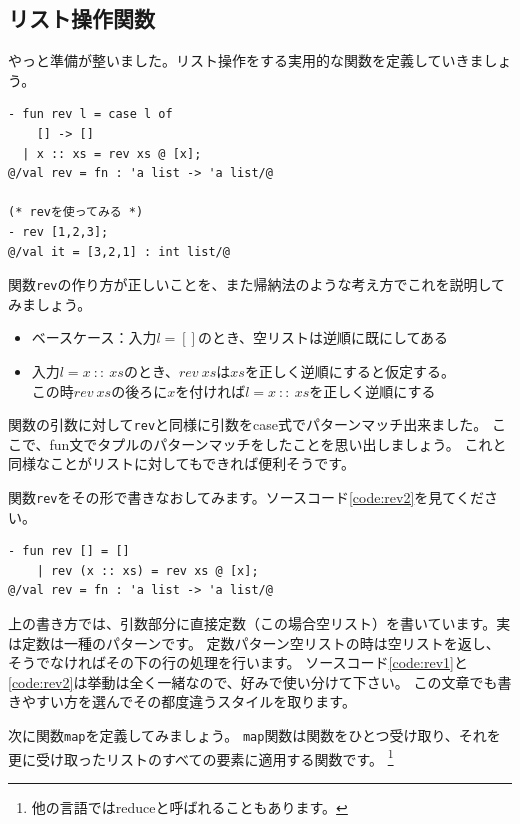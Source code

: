 \documentclass[11pt,a4paper]{article}
\begin{document}
\subsection{リスト操作関数}

やっと準備が整いました。リスト操作をする実用的な関数を定義していきましょう。

\begin{lstlisting}[caption=リストを逆順にする関数revを定義する,label=code:rev1]
- fun rev l = case l of
    [] -> []
  | x :: xs = rev xs @ [x];
@/val rev = fn : 'a list -> 'a list/@

(* revを使ってみる *)
- rev [1,2,3];
@/val it = [3,2,1] : int list/@
\end{lstlisting}

関数\lstinline{rev}の作り方が正しいことを、また帰納法のような考え方でこれを説明してみましょう。
\begin{itemize}
\item ベースケース：入力$l=[]$のとき、空リストは逆順に既にしてある
\item 入力$l = x \ :: \ xs$のとき、$rev \ xs$は$xs$を正しく逆順にすると仮定する。\\
  この時$rev \ xs$の後ろに$x$を付ければ$l = x \ :: \ xs$を正しく逆順にする
\end{itemize}

関数の引数に対して\lstinline{rev}と同様に引数をcase式でパターンマッチ出来ました。
ここで、fun文でタプルのパターンマッチをしたことを思い出しましょう。
これと同様なことがリストに対してもできれば便利そうです。

関数\lstinline{rev}をその形で書きなおしてみます。ソースコード\ref{code:rev2}を見てください。

\begin{lstlisting}[caption=引数部分でのパターンマッチ,label=code:rev2]
- fun rev [] = []
    | rev (x :: xs) = rev xs @ [x];
@/val rev = fn : 'a list -> 'a list/@
\end{lstlisting}

上の書き方では、引数部分に直接定数（この場合空リスト）を書いています。実は定数は一種のパターンです。
定数パターン空リストの時は空リストを返し、そうでなければその下の行の処理を行います。
ソースコード\ref{code:rev1}と\ref{code:rev2}は挙動は全く一緒なので、好みで使い分けて下さい。
この文章でも書きやすい方を選んでその都度違うスタイルを取ります。

次に関数\lstinline{map}を定義してみましょう。
\lstinline{map}関数は関数をひとつ受け取り、それを更に受け取ったリストのすべての要素に適用する関数です。
\footnote{他の言語ではreduceと呼ばれることもあります。}
\end{document}
